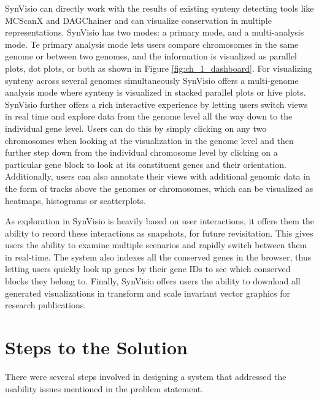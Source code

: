 SynVisio can directly work with the results of existing synteny detecting tools like MCScanX\cite{wang2012mcscanx} and DAGChainer\cite{haas2004dagchainer} and can visualize conservation in multiple representations. SynVisio has two modes: a primary mode, and a multi-analysis mode. Te primary analysis mode lets users compare chromosomes in the same genome or between two genomes, and the information is visualized as parallel plots, dot plots, or both as shown in Figure \ref{fig:ch_1_dashboard}. For visualizing synteny across several genomes simultaneously SynVisio offers a multi-genome analysis mode where synteny is visualized in stacked parallel plots or hive plots. SynVisio further offers a rich interactive experience by letting users switch views in real time and explore data from the genome level all the way down to the individual gene level. Users can do this by simply clicking on any two chromosomes when looking at the visualization in the genome level and then further step down from the individual chromosome level by clicking on a particular gene block to look at its constituent genes and their orientation. Additionally, users can also annotate their views with additional genomic data in the form of tracks above the genomes or chromosomes, which can be visualized as heatmaps, histograms or scatterplots.

As exploration in SynVisio is heavily based on user interactions, it offers them the ability to record these interactions as snapshots, for future revisitation. This gives users the ability to examine multiple scenarios and rapidly switch between them in real-time. The system also indexes all the conserved genes in the browser, thus letting users quickly look up genes by their gene IDs to see which conserved blocks they belong to. Finally, SynVisio offers users the ability to download all generated visualizations in transform and scale invariant vector graphics for research publications.

\section{Steps to the Solution} 
There were several steps involved in designing a system that addressed the usability issues mentioned in the problem statement.

